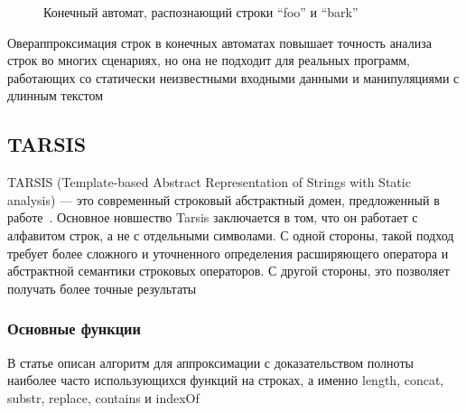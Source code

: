 \begin{figure}[h]
    \centering
    \caption{Конечный автомат, распознающий строки ``foo'' и ``bark''}
\label{fig:automaton}
\end{figure}

Овераппроксимация строк в конечных автоматах повышает точность анализа строк во многих сценариях, но она не подходит для реальных программ, работающих со статически неизвестными входными данными и манипуляциями с длинным текстом




\newpage
\subsection{TARSIS}

TARSIS (Template-based Abstract Representation of Strings with Static analysis) — это современный строковый абстрактный домен, предложенный в работе~\cite{tarsis2021}. Основное новшество Tarsis заключается в том, что он работает с алфавитом строк, а не с отдельными символами. С одной стороны, такой подход требует более сложного и уточненного определения расширяющего оператора и абстрактной семантики строковых операторов. С другой стороны, это позволяет получать более точные результаты

\subsubsection*{Основные функции}
В статье описан алгоритм для аппроксимации с доказательством полноты наиболее часто использующихся функций на строках, а именно length, concat, substr, replace, contains и indexOf

